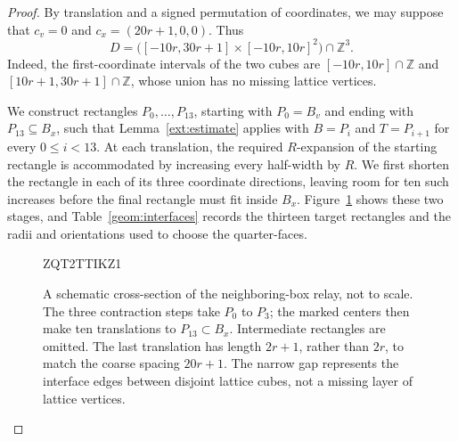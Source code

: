 \documentclass[11pt]{article}
\theoremstyle{definition}
\theoremstyle{remark}
\numberwithin{equation}{section}
\begin{document}
\begin{proof}
By translation and a signed permutation of coordinates, we may suppose that
$c_v=0$ and $c_x=(20r+1,0,0)$. Thus
\begin{equation}\label{geom:prism}
  D=\bigl([-10r,30r+1]\times[-10r,10r]^2\bigr)\cap\mathbb Z^3.
\end{equation}
Indeed, the first-coordinate intervals of the two cubes are
$[-10r,10r]\cap\mathbb Z$ and $[10r+1,30r+1]\cap\mathbb Z$, whose union has
no missing lattice vertices.

We construct rectangles $P_0,\ldots,P_{13}$, starting with $P_0=B_v$ and
ending with $P_{13}\subseteq B_x$, such that
Lemma~\ref{ext:estimate} applies with $B=P_i$ and $T=P_{i+1}$ for every
$0\le i<13$. At each translation, the required $R$-expansion of the starting
rectangle is accommodated by increasing every half-width by $R$.
We first shorten the rectangle in each of its three coordinate directions,
leaving room for ten such increases before the final rectangle must fit
inside $B_x$. Figure~\ref{geom:figure} shows these two stages, and
Table~\ref{geom:interfaces} records the thirteen target rectangles and
the radii and orientations used to choose the quarter-faces.

\begin{figure}[tbp]

ZQT2TTIKZ1
\caption{A schematic cross-section of the neighboring-box relay, not to scale.
The three contraction steps take $P_0$ to $P_3$; the marked centers then make
ten translations to $P_{13}\subset B_x$. Intermediate rectangles are omitted.
The last translation has length $2r+1$, rather than $2r$, to match the coarse
spacing $20r+1$. The narrow gap represents the interface edges between disjoint
lattice cubes, not a missing layer of lattice vertices.}
\label{geom:figure}
\end{figure}

\begin{table}[tbp]


\end{table}
\end{proof}
\end{document}
